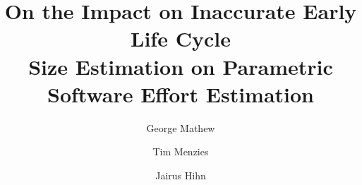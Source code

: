 \documentclass[final,twocolumn,5p]{elsarticle}
\begin{document}
\begin{frontmatter}
\title{On the Impact on Inaccurate Early Life Cycle\\ Size Estimation on Parametric Software Effort Estimation}
\author{George Mathew}
\author{Tim Menzies}
\author{Jairus Hihn}
\address{Department of Computer Science, North Carolina State University, Raleigh, NC, USA,\\
Jet Propulsion Laboratory, Pasadena, CA}





\end{frontmatter}
\end{document}
